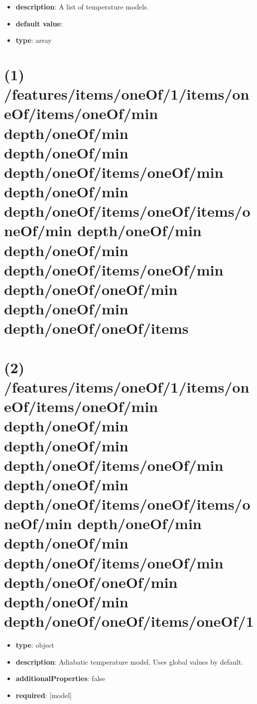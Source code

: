 \begin{itemize}[leftmargin=0em]\item {\bf description}: A list of temperature models.
\item {\bf default value}: 
\item {\bf type}: array
\end{itemize}\section{(1) /features/items/oneOf/1/items/oneOf/items/oneOf/min depth/oneOf/min depth/oneOf/min depth/oneOf/items/oneOf/min depth/oneOf/min depth/oneOf/items/oneOf/items/oneOf/min depth/oneOf/min depth/oneOf/min depth/oneOf/items/oneOf/min depth/oneOf/oneOf/min depth/oneOf/min depth/oneOf/oneOf/items}

\section{(2) /features/items/oneOf/1/items/oneOf/items/oneOf/min depth/oneOf/min depth/oneOf/min depth/oneOf/items/oneOf/min depth/oneOf/min depth/oneOf/items/oneOf/items/oneOf/min depth/oneOf/min depth/oneOf/min depth/oneOf/items/oneOf/min depth/oneOf/oneOf/min depth/oneOf/min depth/oneOf/oneOf/items/oneOf/1}
\begin{itemize}[leftmargin=2em]\item {\bf type}: object
\item {\bf description}: Adiabatic temperature model. Uses global values by default.
\item {\bf additionalProperties}: false
\item {\bf required}: [model]\end{itemize}
